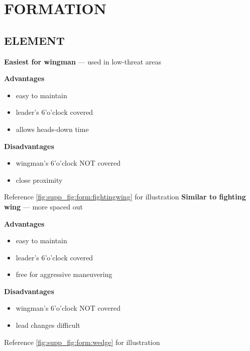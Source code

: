 \section{FORMATION}
\label{sec:suppfig:form}

\subsection{ELEMENT}

\begin{tcoloritemize}
    \textbf{Easiest for wingman} --- used in low-threat areas

    \medskip

    \textbf{Advantages}
    \begin{itemize}
        \item easy to maintain
        \item leader's 6'o'clock covered
        \item allows heads-down time
    \end{itemize}

    \textbf{Disadvantages}
    \begin{itemize}
        \item wingman's 6'o'clock NOT covered
        \item close proximity
    \end{itemize}

    Reference \cref{fig:supp_fig:form:fightingwing} for illustration
    \blueitem[Wedge]
    \textbf{Similar to fighting wing} --- more spaced out
    
    \medskip

    \textbf{Advantages}
    \begin{itemize}
        \item easy to maintain
        \item leader's 6'o'clock covered
        \item free for aggressive maneuvering
    \end{itemize}

    \textbf{Disadvantages}
    \begin{itemize}
        \item wingman's 6'o'clock NOT covered
        \item lead changes difficult
    \end{itemize}

    Reference \cref{fig:supp_fig:form:wedge} for illustration
\end{tcoloritemize}

